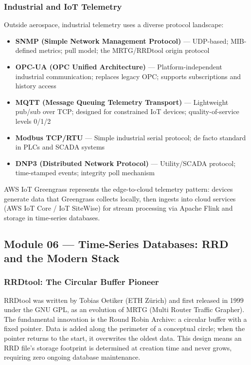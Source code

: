 \documentclass[11pt,letterpaper]{article}
\begin{document}
\subsubsection{Industrial and IoT Telemetry}

Outside aerospace, industrial telemetry uses a diverse protocol landscape:

\begin{itemize}[noitemsep]
  \item \textbf{SNMP (Simple Network Management Protocol)} --- UDP-based; MIB-defined metrics; pull model; the MRTG/RRDtool origin protocol
  \item \textbf{OPC-UA (OPC Unified Architecture)} --- Platform-independent industrial communication; replaces legacy OPC; supports subscriptions and history access
  \item \textbf{MQTT (Message Queuing Telemetry Transport)} --- Lightweight pub/sub over TCP; designed for constrained IoT devices; quality-of-service levels 0/1/2
  \item \textbf{Modbus TCP/RTU} --- Simple industrial serial protocol; de facto standard in PLCs and SCADA systems
  \item \textbf{DNP3 (Distributed Network Protocol)} --- Utility/SCADA protocol; time-stamped events; integrity poll mechanism
\end{itemize}

AWS IoT Greengrass represents the edge-to-cloud telemetry pattern: devices generate data that Greengrass collects locally, then ingests into cloud services (AWS IoT Core / IoT SiteWise) for stream processing via Apache Flink and storage in time-series databases.

\subsection{Module 06 --- Time-Series Databases: RRD and the Modern Stack}

\subsubsection{RRDtool: The Circular Buffer Pioneer}

RRDtool was written by Tobias Oetiker (ETH Zürich) and first released in 1999 under the GNU GPL, as an evolution of MRTG (Multi Router Traffic Grapher). The fundamental innovation is the Round Robin Archive: a circular buffer with a fixed pointer. Data is added along the perimeter of a conceptual circle; when the pointer returns to the start, it overwrites the oldest data. This design means an RRD file's storage footprint is determined at creation time and never grows, requiring zero ongoing database maintenance.
\end{document}
